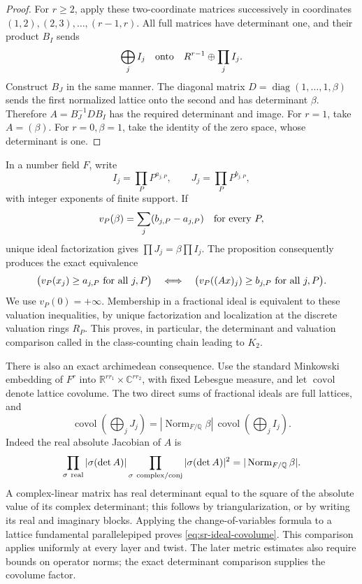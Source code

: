 \begin{proof}
For \(r\geq2\), apply these two-coordinate matrices successively
in coordinates \((1,2),(2,3),\ldots,(r-1,r)\).
All full matrices have determinant one, and their product \(B_I\)
sends
\[
       \bigoplus_j I_j\quad\hbox{onto}\quad
                             R^{r-1}\oplus\prod_j I_j .
\]
Construct \(B_J\) in the same manner.
The diagonal matrix
\(D=\operatorname{diag}(1,\ldots,1,\beta)\) sends the first
normalized lattice onto the second and has determinant \(\beta\).
Therefore \(A=B_J^{-1}DB_I\) has the required determinant and
image. For \(r=1\), take \(A=(\beta)\).
For \(r=0,\beta=1\), take the identity of the zero space,
whose determinant is one.
\end{proof}

In a number field \(F\), write
\[
 I_j=\prod_P P^{a_{j,P}},\qquad
 J_j=\prod_P P^{b_{j,P}},
\]
with integer exponents of finite support.
If
\[
              v_P(\beta)=\sum_j(b_{j,P}-a_{j,P})
                                      \quad\hbox{for every }P ,
\]
unique ideal factorization gives
\(\prod J_j=\beta\prod I_j\).
The proposition consequently produces the exact equivalence
\begin{equation}\label{eq:sr-ideal-valuations}
 \bigl(v_P(x_j)\geq a_{j,P}\ \hbox{for all }j,P\bigr)
 \quad\Longleftrightarrow\quad
 \bigl(v_P((Ax)_j)\geq b_{j,P}\ \hbox{for all }j,P\bigr).
\end{equation}
We use \(v_P(0)=+\infty\).
Membership in a fractional ideal is equivalent to these valuation
inequalities, by unique factorization and localization at the
discrete valuation rings \(R_P\).
This proves, in particular, the determinant and valuation comparison
called  in the class-counting chain leading to \(K_2\).

There is also an exact archimedean consequence.
Use the standard Minkowski embedding of \(F^r\) into
\(\mathbb R^{rr_1}\times\mathbb C^{rr_2}\), with fixed Lebesgue
measure, and let \(\operatorname{covol}\) denote lattice covolume.
The two direct sums of fractional ideals are full lattices, and
\begin{equation}\label{eq:sr-ideal-covolume}
 \operatorname{covol}\left(\bigoplus_jJ_j\right)
   =|\operatorname{Norm}_{F/\mathbb Q}\beta|\,
                  \operatorname{covol}\left(\bigoplus_jI_j\right).
\end{equation}
Indeed the real absolute Jacobian of \(A\) is
\[
 \prod_{\sigma\ {\rm real}}|\sigma(\det A)|
 \prod_{\sigma\ {\rm complex}/\mathrm{conj}}|\sigma(\det A)|^2
                 =|\operatorname{Norm}_{F/\mathbb Q}\beta|.
\]
A complex-linear matrix has real determinant equal to the square
of the absolute value of its complex determinant; this follows
by triangularization, or by writing its real and imaginary blocks.
Applying the change-of-variables formula to a lattice fundamental
parallelepiped proves \eqref{eq:sr-ideal-covolume}.
This comparison applies uniformly at every layer and twist.
The later metric estimates also require bounds on operator norms;
the exact determinant comparison supplies the covolume factor.

